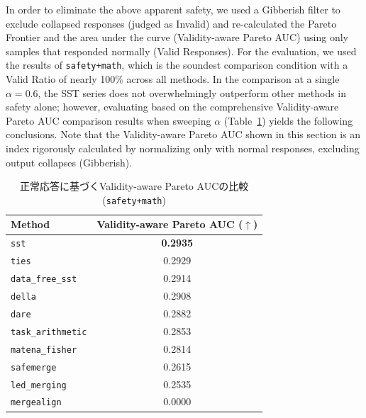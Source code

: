 \documentclass{article}
\begin{document}
In order to eliminate the above apparent safety, we used a Gibberish filter to exclude collapsed responses (judged as Invalid) and re-calculated the Pareto Frontier and the area under the curve (Validity-aware Pareto AUC) using only samples that responded normally (Valid Responses).
For the evaluation, we used the results of \texttt{safety+math}, which is the soundest comparison condition with a Valid Ratio of nearly 100\% across all methods. In the comparison at a single $\alpha=0.6$, the SST series does not overwhelmingly outperform other methods in safety alone; however, evaluating based on the comprehensive Validity-aware Pareto AUC comparison results when sweeping $\alpha$ (Table~\ref{tab:pareto_auc}) yields the following conclusions. Note that the Validity-aware Pareto AUC shown in this section is an index rigorously calculated by normalizing only with normal responses, excluding output collapses (Gibberish).

\begin{table}[H]
\centering
\caption{正常応答に基づくValidity-aware Pareto AUCの比較(\texttt{safety+math})}
\label{tab:pareto_auc}
\small
\begin{tabular}{lc}
\toprule
\textbf{Method} & \textbf{Validity-aware Pareto AUC ($\uparrow$)} \\
\midrule
\texttt{sst} & \textbf{0.2935} \\
\texttt{ties} & 0.2929 \\
\texttt{data\_free\_sst} & 0.2914 \\
\texttt{della} & 0.2908 \\
\texttt{dare} & 0.2882 \\
\texttt{task\_arithmetic} & 0.2853 \\
\texttt{matena\_fisher} & 0.2814 \\
\texttt{safemerge} & 0.2615 \\
\texttt{led\_merging} & 0.2535 \\
\texttt{mergealign} & 0.0000 \\
\bottomrule
\end{tabular}
\end{table}
\end{document}
